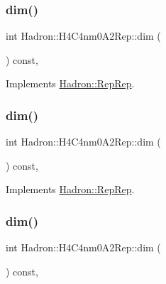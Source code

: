 \subsubsection{\texorpdfstring{dim()}{dim()}\hspace{0.1cm}{\footnotesize\ttfamily [3/5]}}
{\footnotesize\ttfamily int Hadron\+::\+H4\+C4nm0\+A2\+Rep\+::dim (\begin{DoxyParamCaption}{ }\end{DoxyParamCaption}) const\hspace{0.3cm}{\ttfamily [inline]}, {\ttfamily [virtual]}}



Implements \mbox{\hyperlink{structHadron_1_1RepRep_a92c8802e5ed7afd7da43ccfd5b7cd92b}{Hadron\+::\+Rep\+Rep}}.

\mbox{\label{structHadron_1_1H4C4nm0A2Rep_a150c451dc8790702eb41daeb3f47d282}} 
\subsubsection{\texorpdfstring{dim()}{dim()}\hspace{0.1cm}{\footnotesize\ttfamily [4/5]}}
{\footnotesize\ttfamily int Hadron\+::\+H4\+C4nm0\+A2\+Rep\+::dim (\begin{DoxyParamCaption}{ }\end{DoxyParamCaption}) const\hspace{0.3cm}{\ttfamily [inline]}, {\ttfamily [virtual]}}



Implements \mbox{\hyperlink{structHadron_1_1RepRep_a92c8802e5ed7afd7da43ccfd5b7cd92b}{Hadron\+::\+Rep\+Rep}}.

\mbox{\label{structHadron_1_1H4C4nm0A2Rep_a150c451dc8790702eb41daeb3f47d282}} 
\subsubsection{\texorpdfstring{dim()}{dim()}\hspace{0.1cm}{\footnotesize\ttfamily [5/5]}}
{\footnotesize\ttfamily int Hadron\+::\+H4\+C4nm0\+A2\+Rep\+::dim (\begin{DoxyParamCaption}{ }\end{DoxyParamCaption}) const\hspace{0.3cm}{\ttfamily [inline]}, {\ttfamily [virtual]}}



